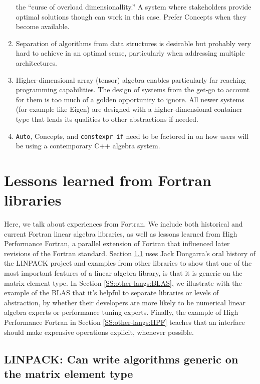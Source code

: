\begin{enumerate}
  the ``curse of overload dimensionallity.''  A system where
  stakeholders provide optimal solutions though can work in this
  case. Prefer Concepts when they become available.
\item Separation of algorithms from data structures is desirable but
  probably very hard to achieve in an optimal sense, particularly when
  addressing multiple architectures.
\item Higher-dimensional array (tensor) algebra enables particularly
  far reaching programming capabilities. The design of systems from
  the get-go to account for them is too much of a golden opportunity
  to ignore. All newer systems (for example like Eigen) are designed
  with a higher-dimensional container type that lends its qualities to
  other abstractions if needed.
\item \texttt{Auto}, Concepts, and \texttt{constexpr if} need to be
  factored in on how users will be using a contemporary C++ algebra
  system.
\end{enumerate}

\section{Lessons learned from Fortran libraries}
\label{S:other-langs}

Here, we talk about experiences from Fortran.  We include both
historical and current Fortran linear algebra libraries, as well as
lessons learned from High Performance Fortran, a parallel extension of
Fortran that influenced later revisions of the Fortran standard.
Section \ref{SS:other-langs:LINPACK} uses Jack Dongarra's oral history
of the LINPACK project and examples from other libraries to show that
one of the most important features of a linear algebra library, is
that it is generic on the matrix element type.  In Section
\ref{SS:other-langs:BLAS}, we illustrate with the example of the BLAS
that it's helpful to separate libraries or levels of abstraction, by
whether their developers are more likely to be numerical linear
algebra experts or performance tuning experts.  Finally, the example
of High Performance Fortran in Section \ref{SS:other-langs:HPF}
teaches that an interface should make expensive operations explicit,
whenever possible.

\subsection{LINPACK: Can write algorithms generic on the matrix element type}
\label{SS:other-langs:LINPACK}

